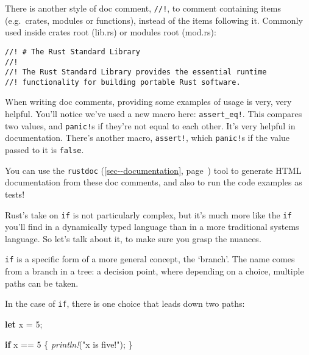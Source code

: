\documentclass[a4paper,]{book}
\renewcommand*{\hyperref}[2][\ar]{%
  \def\ar{#2}%
  #2 (\autoref{#1}, page~\pageref{#1})}
\newenvironment{Shaded}{\begin{snugshade}}{\end{snugshade}}
\newcommand{\KeywordTok}[1]{\textcolor[rgb]{0.13,0.29,0.53}{\textbf{{#1}}}}
\newcommand{\DecValTok}[1]{\textcolor[rgb]{0.00,0.00,0.81}{{#1}}}
\newcommand{\StringTok}[1]{\textcolor[rgb]{0.31,0.60,0.02}{{#1}}}
\newcommand{\PreprocessorTok}[1]{\textcolor[rgb]{0.56,0.35,0.01}{\textit{{#1}}}}
\newcommand{\NormalTok}[1]{{#1}}
\begin{document}
There is another style of doc comment, \texttt{//!}, to comment
containing items (e.g.~crates, modules or functions), instead of the
items following it. Commonly used inside crates root (lib.rs) or modules
root (mod.rs):

\begin{verbatim}
//! # The Rust Standard Library
//!
//! The Rust Standard Library provides the essential runtime
//! functionality for building portable Rust software.
\end{verbatim}

When writing doc comments, providing some examples of usage is very,
very helpful. You'll notice we've used a new macro here:
\texttt{assert\_eq!}. This compares two values, and \texttt{panic!}s if
they're not equal to each other. It's very helpful in documentation.
There's another macro, \texttt{assert!}, which \texttt{panic!}s if the
value passed to it is \texttt{false}.

You can use the \hyperref[sec--documentation]{\texttt{rustdoc}} tool to
generate HTML documentation from these doc comments, and also to run the
code examples as tests!


Rust's take on \texttt{if} is not particularly complex, but it's much
more like the \texttt{if} you'll find in a dynamically typed language
than in a more traditional systems language. So let's talk about it, to
make sure you grasp the nuances.

\texttt{if} is a specific form of a more general concept, the `branch'.
The name comes from a branch in a tree: a decision point, where
depending on a choice, multiple paths can be taken.

In the case of \texttt{if}, there is one choice that leads down two
paths:

\begin{Shaded}
\begin{Highlighting}[]
\KeywordTok{let} \NormalTok{x = }\DecValTok{5}\NormalTok{;}

\KeywordTok{if} \NormalTok{x == }\DecValTok{5} \NormalTok{\{}
    \PreprocessorTok{println!}\NormalTok{(}\StringTok{"x is five!"}\NormalTok{);}
\NormalTok{\}}
\end{Highlighting}
\end{Shaded}
\end{document}
